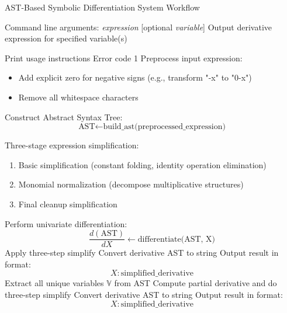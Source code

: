 \documentclass{report}
\begin{document}
\begin{algorithm}[H]
\caption{AST-Based Symbolic Differentiation System Workflow}
\begin{algorithmic}[]
\Require Command line arguments: \textit{expression} [optional \textit{variable}]
\Ensure Output derivative expression for specified variable(s)

    \State Print usage instructions
    \State \Return Error code 1
\Else
    \State Preprocess input expression:
    \begin{itemize}
        \item Add explicit zero for negative signs (e.g., transform "-x" to "0-x")
        \item Remove all whitespace characters
    \end{itemize}
    
    \State Construct Abstract Syntax Tree:
    \begin{equation*}
        \text{AST} \gets \text{build\_ast(preprocessed\_expression)}
    \end{equation*}
    
    \State Three-stage expression simplification:
    \begin{enumerate}
        \item Basic simplification (constant folding, identity operation elimination)
        \item Monomial normalization (decompose multiplicative structures)
        \item Final cleanup simplification
    \end{enumerate}
    
        \State Perform univariate differentiation:
        \begin{equation*}
            \frac{d(\text{AST})}{dX} \gets \text{differentiate(AST, X)}
        \end{equation*}
        \State Apply three-step simplify
        \State Convert derivative AST to string
        \State Output result in format:
        \begin{equation*}
            X: \text{simplified\_derivative}
        \end{equation*}
    \Else
        \State Extract all unique variables $\mathbb{V}$ from AST
            \State Compute partial derivative and do three-step simplify
            \State Convert derivative AST to string
            \State Output result in format:
            \begin{equation*}
                X: \text{simplified\_derivative}
            \end{equation*}
        \EndFor
    \EndIf
\EndIf
\end{algorithmic}
\end{algorithm}
\end{document}
